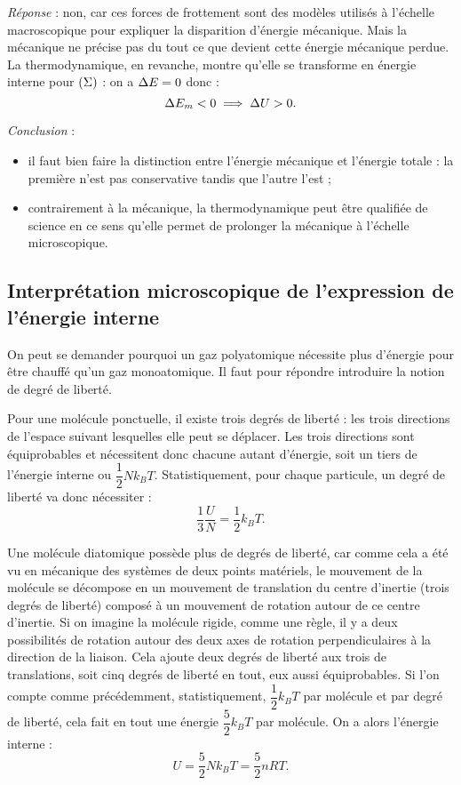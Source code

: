 \emph{Réponse} : non, car ces forces de frottement sont des modèles utilisés à l'échelle macroscopique pour expliquer la disparition d'énergie mécanique. Mais la mécanique ne précise pas du tout ce que devient cette énergie mécanique perdue. La thermodynamique, en revanche, montre qu'elle se transforme en énergie interne pour \(\left(\Sigma\right)\) : on a \(\adif{E}=0\) donc : \[\adif{E_m}<0\imp\adif{U}>0.\]

\emph{Conclusion} : \begin{itemize}
\item il faut bien faire la distinction entre l'énergie mécanique et l'énergie totale : la première n'est pas conservative tandis que l'autre l'est ;
\item contrairement à la mécanique, la thermodynamique peut être qualifiée de science  en ce sens qu'elle permet de prolonger la mécanique à l'échelle microscopique.
\end{itemize}

\subsection{Interprétation microscopique de l'expression de l'énergie interne}

On peut se demander pourquoi un gaz polyatomique nécessite plus d'énergie pour être chauffé qu'un gaz monoatomique. Il faut pour répondre introduire la notion de degré de liberté.

Pour une molécule ponctuelle, il existe trois degrés de liberté : les trois directions de l'espace suivant lesquelles elle peut se déplacer. Les trois directions sont équiprobables et nécessitent donc chacune autant d'énergie, soit un tiers de l'énergie interne ou \(\dfrac{1}{2}Nk_BT\). Statistiquement, pour chaque particule, un degré de liberté va donc nécessiter : \[\dfrac{1}{3}\dfrac{U}{N}=\dfrac{1}{2}k_BT.\]

Une molécule diatomique possède plus de degrés de liberté, car comme cela a été vu en mécanique des systèmes de deux points matériels, le mouvement de la molécule se décompose en un mouvement de translation du centre d'inertie (trois degrés de liberté) composé à un mouvement de rotation autour de ce centre d'inertie. Si on imagine la molécule rigide, comme une règle, il y a deux possibilités de rotation autour des deux axes de rotation perpendiculaires à la direction de la liaison. Cela ajoute deux degrés de liberté aux trois de translations, soit cinq degrés de liberté en tout, eux aussi équiprobables. Si l'on compte comme précédemment, statistiquement, \(\dfrac{1}{2}k_BT\) par molécule et par degré de liberté, cela fait en tout une énergie \(\dfrac{5}{2}k_BT\) par molécule. On a alors l'énergie interne : \[U=\dfrac{5}{2}Nk_BT=\dfrac{5}{2}nRT.\]

